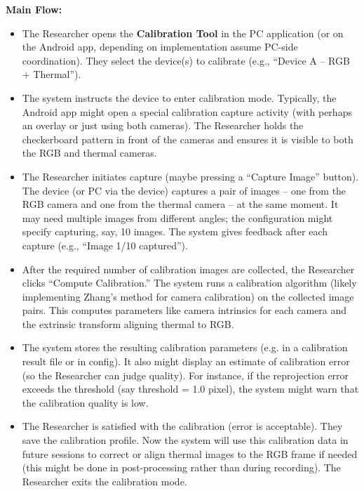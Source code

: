\textbf{Main Flow:}
\begin{itemize}
    \item The Researcher opens the \textbf{Calibration Tool} in the PC application (or on the Android app, depending on implementation \textemdash assume PC-side coordination). They select the device(s) to calibrate (e.g., ``Device A -- RGB + Thermal'').
    \item The system instructs the device to enter calibration mode. Typically, the Android app might open a special calibration capture activity (with perhaps an overlay or just using both cameras). The Researcher holds the checkerboard pattern in front of the cameras and ensures it is visible to both the RGB and thermal cameras.
    \item The Researcher initiates capture (maybe pressing a ``Capture Image'' button). The device (or PC via the device) captures a pair of images -- one from the RGB camera and one from the thermal camera -- at the same moment. It may need multiple images from different angles; the configuration might specify capturing, say, 10 images. The system gives feedback after each capture (e.g., ``Image 1/10 captured'').
    \item After the required number of calibration images are collected, the Researcher clicks ``Compute Calibration.'' The system runs a calibration algorithm (likely implementing Zhang's method for camera calibration) on the collected image pairs. This computes parameters like camera intrinsics for each camera and the extrinsic transform aligning thermal to RGB.
    \item The system stores the resulting calibration parameters (e.g. in a calibration result file or in config). It also might display an estimate of calibration error (so the Researcher can judge quality). For instance, if the reprojection error exceeds the threshold (say threshold = 1.0 pixel), the system might warn that the calibration quality is low.
    \item The Researcher is satisfied with the calibration (error is acceptable). They save the calibration profile. Now the system will use this calibration data in future sessions to correct or align thermal images to the RGB frame if needed (this might be done in post-processing rather than during recording). The Researcher exits the calibration mode.
\end{itemize}

